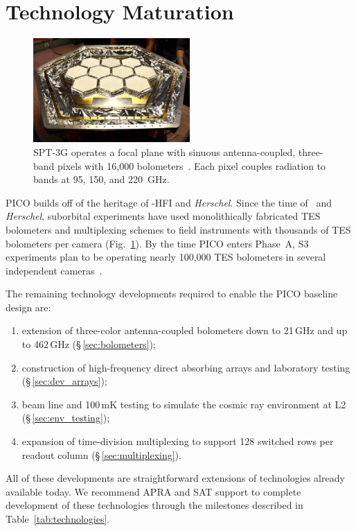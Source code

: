 \section{Technology Maturation}
\label{sec:technology_maturation} %
%
\begin{figure}  %
\parbox{2.35in}{
\includegraphics[width=2.35in]{figures/SPT3G.jpg} }  %
\parbox{1.40in}{
\caption{\captiontext SPT-3G operates a focal plane with sinuous antenna-coupled, three-band pixels with
16,000 bolometers~\citep{Dutcher2018}. Each pixel couples radiation to bands at 95, 150, and
220~GHz.
\label{fig:spt_fp} }
}
\end{figure}
PICO builds off of the heritage of \planck-HFI and \textit{Herschel}.  Since the time of \planck\ and \textit{Herschel}, suborbital experiments have used monolithically fabricated TES bolometers and multiplexing schemes to field instruments with thousands of \ac{TES} bolometers per camera (Fig.~\ref{fig:spt_fp}). By the time PICO enters Phase~A, S3 experiments plan to be operating nearly 100,000 \ac{TES} bolometers in several independent cameras~\citep{Simons2018,biceparray,spt3g}.

 The remaining technology developments required to enable the PICO baseline design are:
\begin{enumerate}
\item extension of three-color antenna-coupled bolometers down to 21\,GHz and up to 462\,GHz (\S\,\ref{sec:bolometers});
\item construction of high-frequency direct absorbing arrays and laboratory testing (\S\,\ref{sec:dev_arrays});
\item beam line and 100\,mK testing to simulate the cosmic ray environment at L2 (\S\,\ref{sec:env_testing});
\item expansion of time-division multiplexing to support 128 switched rows per readout column (\S\,\ref{sec:multiplexing}).
\end{enumerate}
All of these developments are straightforward extensions of technologies already available today.  We recommend APRA and SAT support to complete development of these technologies through the milestones described in Table~\ref{tab:technologies}.


